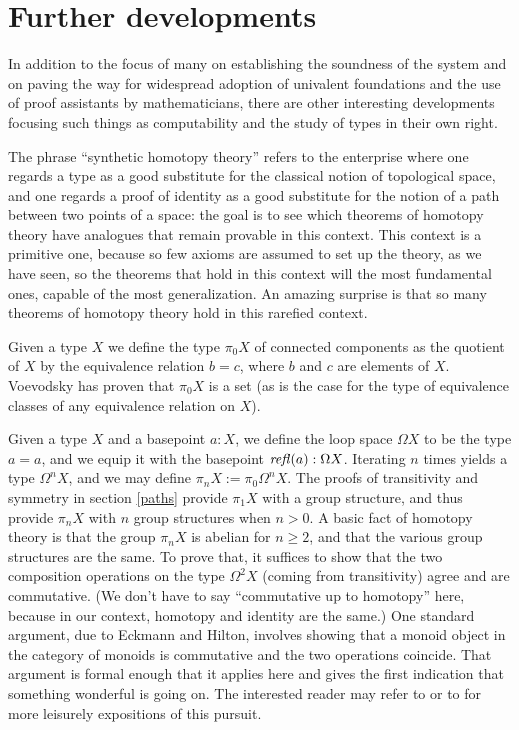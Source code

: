\documentclass[letter,12pt]{amsart}
\theoremstyle{definition}
\theoremstyle{remark}
\numberwithin{equation}{section}
\newcommand{\refl}{\mathop{{\it refl}}}
\begin{document}
\section{Further developments}\label{otherdev}

In addition to the focus of many on establishing the soundness of the system and on paving the way for widespread adoption of univalent
foundations and the use of proof assistants by mathematicians, there are other interesting developments focusing such things as computability
and the study of types in their own right.

The phrase ``synthetic homotopy theory'' refers to the enterprise where one regards a type as a good substitute for the classical notion of
topological space, and one regards a proof of identity as a good substitute for the notion of a path between two points of a space: the goal is
to see which theorems of homotopy theory have analogues that remain provable in this context.  This context is a primitive one, because so few
axioms are assumed to set up the theory, as we have seen, so the theorems that hold in this context will the most fundamental ones, capable of
the most generalization.  An amazing surprise is that so many theorems of homotopy theory hold in this rarefied context.

Given a type $X$ we define the type $\pi_0 X$ of connected components as the quotient of $X$ by the equivalence relation $b=c$, where $b$ and
$c$ are elements of $X$.  Voevodsky has proven that $\pi_0 X$ is a set (as is the case for the type of equivalence classes of any equivalence
relation on $X$).

Given a type $X$ and a basepoint $a:X$, we define the loop space $\Omega X$ to be the type $a=a$, and we equip it with the basepoint $\refl(a) : \Omega X$.
Iterating $n$ times yields a type $\Omega^n X$, and we may define $\pi_n X := \pi_0 \Omega^n X$.  The proofs of transitivity and symmetry in
section \ref{paths} provide $\pi_1 X$ with a group structure, and thus provide $\pi_n X$ with $n$ group structures when $n > 0$.  A basic fact
of homotopy theory is that the group $\pi_n X$ is abelian for $n \ge 2$, and that the various group structures are the same.  To prove that, it
suffices to show that the two composition operations on the type $\Omega^2 X$ (coming from transitivity) agree and are commutative.  (We don't
have to say ``commutative up to homotopy'' here, because in our context, homotopy and identity are the same.)  One standard argument, due to
Eckmann and Hilton, involves showing that a monoid object in the category of monoids is commutative and the two operations coincide.  That
argument is formal enough that it applies here \citep[Theorem 2.1.6]{hottbook} and gives the first indication that something wonderful is going
on.  The interested reader may refer to \citep[Chapter 8]{hottbook} or to \citep{1703.03007} for more leisurely expositions of this pursuit.
\end{document}
